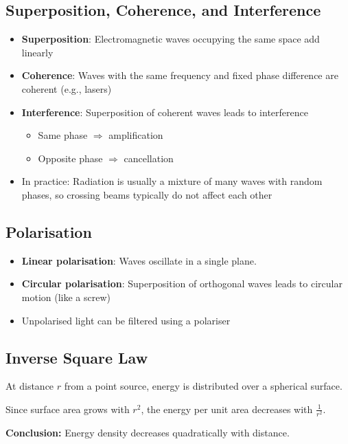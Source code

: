 \documentclass{article}
\begin{document}
\subsection{Superposition, Coherence, and Interference}
\begin{itemize}
  \item \textbf{Superposition}: Electromagnetic waves occupying the same space add linearly
  \item \textbf{Coherence}: Waves with the same frequency and fixed phase difference are coherent (e.g., lasers)
  \item \textbf{Interference}: Superposition of coherent waves leads to interference
  \begin{itemize}
    \item Same phase $\Rightarrow$ amplification
    \item Opposite phase $\Rightarrow$ cancellation
  \end{itemize}
  \item In practice: Radiation is usually a mixture of many waves with random phases, so crossing beams typically do not affect each other
\end{itemize}

\subsection{Polarisation}
\begin{itemize}
  \item \textbf{Linear polarisation}: Waves oscillate in a single plane.
  \item \textbf{Circular polarisation}: Superposition of orthogonal waves leads to circular motion (like a screw)
  \item Unpolarised light can be filtered using a polariser
\end{itemize}

\subsection{Inverse Square Law}
At distance $r$ from a point source, energy is distributed over a spherical surface.

Since surface area grows with $r^2$, the energy per unit area decreases with $\frac{1}{r^2}$.

\textbf{Conclusion:} Energy density decreases quadratically with distance.
\end{document}
